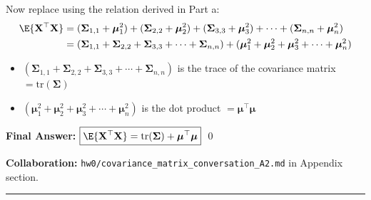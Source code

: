 \documentclass{article}
\begin{document}
\begin{aprob}
    Now replace using the relation derived in Part a:
    \begin{align*}
        \E{\mathbf{X}^\top \mathbf{X}} &= (\boldsymbol\Sigma_{1,1} + \boldsymbol\mu_1^2) + (\boldsymbol\Sigma_{2,2} + \boldsymbol\mu_2^2) + (\boldsymbol\Sigma_{3,3} + \boldsymbol\mu_3^2) + \cdots + (\boldsymbol\Sigma_{n,n} + \boldsymbol\mu_n^2) \\
        &= (\boldsymbol\Sigma_{1,1} + \boldsymbol\Sigma_{2,2} + \boldsymbol\Sigma_{3,3} + \cdots + \boldsymbol\Sigma_{n,n}) + (\boldsymbol\mu_1^2 + \boldsymbol\mu_2^2 + \boldsymbol\mu_3^2 + \cdots + \boldsymbol\mu_n^2)
    \end{align*}

    \begin{itemize}
        \item $(\boldsymbol\Sigma_{1,1} + \boldsymbol\Sigma_{2,2} + \boldsymbol\Sigma_{3,3} + \cdots + \boldsymbol\Sigma_{n,n})$ is the trace of the covariance matrix $= \mathrm{tr}(\boldsymbol\Sigma)$
        \item $(\boldsymbol\mu_1^2 + \boldsymbol\mu_2^2 + \boldsymbol\mu_3^2 + \cdots + \boldsymbol\mu_n^2)$ is the dot product $= \boldsymbol\mu^\top \boldsymbol\mu$
    \end{itemize}

    \medskip
    \textbf{Final Answer:} $\boxed{\E{\mathbf{X}^\top \mathbf{X}} = \mathrm{tr}(\boldsymbol\Sigma) + \boldsymbol\mu^\top \boldsymbol\mu}$ \qed

    \medskip
    \textbf{Collaboration:} \texttt{hw0/covariance\_matrix\_conversation\_A2.md} in Appendix section.

\end{aprob}

\noindent\rule{\textwidth}{0.4pt}
\end{document}
